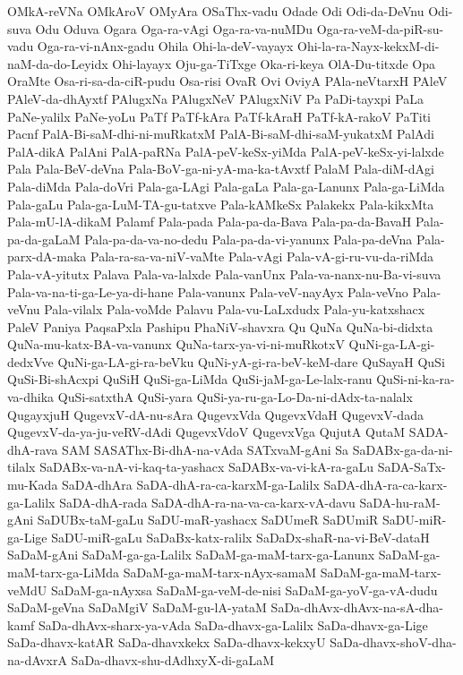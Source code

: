 {OMkA-reVNa
OMkAroV
OMyAra
OSaThx-vadu
Odade
Odi
Odi-da-DeVnu
Odi-suva
Odu
Oduva
Ogara
Oga-ra-vAgi
Oga-ra-va-nuMDu
Oga-ra-veM-da-piR-su-vadu
Oga-ra-vi-nAnx-gadu
Ohila
Ohi-la-deV-vayayx
Ohi-la-ra-Nayx-kekxM-di-naM-da-do-Leyidx
Ohi-layayx
Oju-ga-TiTxge
Oka-ri-keya
OlA-Du-titxde
Opa
OraMte
Osa-ri-sa-da-ciR-pudu
Osa-risi
OvaR
Ovi
OviyA
PAla-neVtarxH
PAleV
PAleV-da-dhAyxtf
PAlugxNa
PAlugxNeV
PAlugxNiV
Pa
PaDi-tayxpi
PaLa
PaNe-yalilx
PaNe-yoLu
PaTf
PaTf-kAra
PaTf-kAraH
PaTf-kA-rakoV
PaTiti
Pacnf
PalA-Bi-saM-dhi-ni-muRkatxM
PalA-Bi-saM-dhi-saM-yukatxM
PalAdi
PalA-dikA
PalAni
PalA-paRNa
PalA-peV-keSx-yiMda
PalA-peV-keSx-yi-lalxde
Pala
Pala-BeV-deVna
Pala-BoV-ga-ni-yA-ma-ka-tAvxtf
PalaM
Pala-diM-dAgi
Pala-diMda
Pala-doVri
Pala-ga-LAgi
Pala-gaLa
Pala-ga-Lanunx
Pala-ga-LiMda
Pala-gaLu
Pala-ga-LuM-TA-gu-tatxve
Pala-kAMkeSx
Palakekx
Pala-kikxMta
Pala-mU-lA-dikaM
Palamf
Pala-pada
Pala-pa-da-Bava
Pala-pa-da-BavaH
Pala-pa-da-gaLaM
Pala-pa-da-va-no-dedu
Pala-pa-da-vi-yanunx
Pala-pa-deVna
Pala-parx-dA-maka
Pala-ra-sa-va-niV-vaMte
Pala-vAgi
Pala-vA-gi-ru-vu-da-riMda
Pala-vA-yitutx
Palava
Pala-va-lalxde
Pala-vanUnx
Pala-va-nanx-nu-Ba-vi-suva
Pala-va-na-ti-ga-Le-ya-di-hane
Pala-vanunx
Pala-veV-nayAyx
Pala-veVno
Pala-veVnu
Pala-vilalx
Pala-voMde
Palavu
Pala-vu-LaLxdudx
Pala-yu-katxshacx
PaleV
Paniya
PaqsaPxla
Pashipu
PhaNiV-shavxra
Qu
QuNa
QuNa-bi-didxta
QuNa-mu-katx-BA-va-vanunx
QuNa-tarx-ya-vi-ni-muRkotxV
QuNi-ga-LA-gi-dedxVve
QuNi-ga-LA-gi-ra-beVku
QuNi-yA-gi-ra-beV-keM-dare
QuSayaH
QuSi
QuSi-Bi-shAcxpi
QuSiH
QuSi-ga-LiMda
QuSi-jaM-ga-Le-lalx-ranu
QuSi-ni-ka-ra-va-dhika
QuSi-satxthA
QuSi-yara
QuSi-ya-ru-ga-Lo-Da-ni-dAdx-ta-nalalx
QugayxjuH
QugevxV-dA-nu-sAra
QugevxVda
QugevxVdaH
QugevxV-dada
QugevxV-da-ya-ju-veRV-dAdi
QugevxVdoV
QugevxVga
QujutA
QutaM
SADA-dhA-rava
SAM
SASAThx-Bi-dhA-na-vAda
SATxvaM-gAni
Sa
SaDABx-ga-da-ni-tilalx
SaDABx-va-nA-vi-kaq-ta-yashacx
SaDABx-va-vi-kA-ra-gaLu
SaDA-SaTx-mu-Kada
SaDA-dhAra
SaDA-dhA-ra-ca-karxM-ga-Lalilx
SaDA-dhA-ra-ca-karx-ga-Lalilx
SaDA-dhA-rada
SaDA-dhA-ra-na-va-ca-karx-vA-davu
SaDA-hu-raM-gAni
SaDUBx-taM-gaLu
SaDU-maR-yashacx
SaDUmeR
SaDUmiR
SaDU-miR-ga-Lige
SaDU-miR-gaLu
SaDaBx-katx-ralilx
SaDaDx-shaR-na-vi-BeV-dataH
SaDaM-gAni
SaDaM-ga-ga-Lalilx
SaDaM-ga-maM-tarx-ga-Lanunx
SaDaM-ga-maM-tarx-ga-LiMda
SaDaM-ga-maM-tarx-nAyx-samaM
SaDaM-ga-maM-tarx-veMdU
SaDaM-ga-nAyxsa
SaDaM-ga-veM-de-nisi
SaDaM-ga-yoV-ga-vA-dudu
SaDaM-geVna
SaDaMgiV
SaDaM-gu-lA-yataM
SaDa-dhAvx-dhAvx-na-sA-dha-kamf
SaDa-dhAvx-sharx-ya-vAda
SaDa-dhavx-ga-Lalilx
SaDa-dhavx-ga-Lige
SaDa-dhavx-katAR
SaDa-dhavxkekx
SaDa-dhavx-kekxyU
SaDa-dhavx-shoV-dha-na-dAvxrA
SaDa-dhavx-shu-dAdhxyX-di-gaLaM
}
